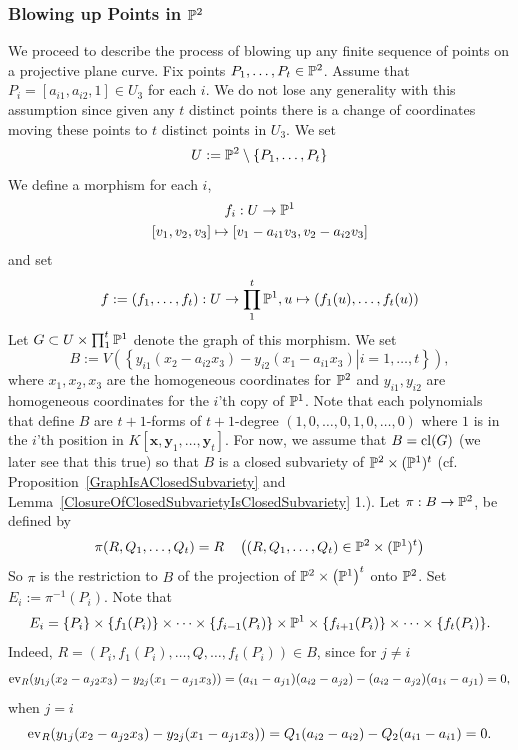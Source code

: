     \subsubsection{Blowing up Points in $\mathbb{P}^2$}
    We proceed to describe the process of blowing up any finite sequence of points on a projective plane curve. Fix points $P_1,\dots,P_t\in \mathbb{P}^2$. Assume that $P_i=[a_{i1},a_{i2},1]\in U_3$ for each $i$. We do not lose any generality with this assumption since given any $t$ distinct points there is a change of coordinates moving these points to $t$ distinct points in $U_3$. We set 
    $$
        U := \mathbb{P}^2 \setminus \{P_1,\dots,P_t\}
    $$
    We define a morphism for each $i$,
    \begin{gather*}
        f_i : U \rightarrow \mathbb{P}^1\\
        [v_1,v_2,v_3]\mapsto [v_1-a_{i1}v_3,v_2-a_{i2}v_3]
    \end{gather*}
    and set
    $$
        f:= (f_1,\dots,f_t): U\rightarrow \prod_1^t \mathbb{P}^1, u\mapsto (f_1(u),\dots,f_t(u)) 
    $$
    Let $G\subset U\times \prod_1^t \mathbb{P}^1$ denote the graph of this morphism. We set 
    $$
        B := V\left(\left\{ \left.y_{i1}(x_2-a_{i2}x_3)-y_{i2}(x_1-a_{i1}x_3)\right|i=1,\dots,t\right\}\right),
    $$ 
    where $x_1,x_2,x_3$ are the homogeneous coordinates for $\mathbb{P}^2$ and $y_{i1},y_{i2}$ are homogeneous coordinates for the $i$'th copy of $\mathbb{P}^1$. Note that each polynomials that define $B$ are $t+1$-forms of $t+1$-degree $(1,0,\dots,0,1,0,\dots,0)$ where $1$ is in the $i$'th position in $K[\mathbf{x},\mathbf{y}_1,\dots,\mathbf{y}_t]$. For now, we assume that $B=\mathrm{cl}(G)$ (we later see that this true) so that $B$ is a closed subvariety of $\mathbb{P}^2 \times (\mathbb{P}^1)^t$ (cf. Proposition~\ref{GraphIsAClosedSubvariety} and Lemma~\ref{ClosureOfClosedSubvarietyIsClosedSubvariety} 1.). Let $\pi: B\rightarrow \mathbb{P}^2$, be defined by 
    $$
        \pi(R,Q_1,\dots,Q_t) = R \quad \left((R,Q_1,\dots,Q_t)\in \mathbb{P}^2\times (\mathbb{P}^1)^t\right)
    $$ 
    So $\pi$ is the restriction to $B$ of the projection of $\mathbb{P}^2\times \left(\mathbb{P}^1\right)^t$ onto $\mathbb{P}^2$. Set $E_i := \pi^{-1}(P_i)$. Note that 
    $$
        E_i = \{P_i\}\times \{f_1(P_i)\} \times \cdots \times \{f_{i-1}(P_i)\} \times \mathbb{P}^1 \times \{f_{i+1}(P_i)\}\times \cdots \times \{f_t(P_i)\}.
    $$
    Indeed, $R=(P_i,f_1(P_i),\dots,Q,\dots,f_t(P_i))\in B$, since for $j\neq i$
    $$
        \mathrm{ev}_R(y_{1j}(x_2-a_{j2}x_3)-y_{2j}(x_1-a_{j1}x_3))=
            (a_{i1}-a_{j1})(a_{i2}-a_{j2})-(a_{i2}-a_{j2})(a_{1i}-a_{j1})=0,
    $$
    when $j=i$
    $$
        \mathrm{ev}_R(y_{1j}(x_2-a_{j2}x_3)-y_{2j}(x_1-a_{j1}x_3))= Q_1(a_{i2}-a_{i2})-Q_2(a_{i1}-a_{i1})=0.
    $$
